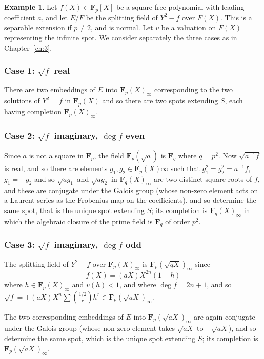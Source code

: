 \documentclass[10pt]{article}
\theoremstyle{definition}
\newtheorem{exam}[theo]{Example}
\def\FF{\mathbf{F}}
\begin{document}
\begin{exam}
\label{4.2.8}
Let $f(X) \in \FF_p[X]$ be a square-free polynomial with leading coefficient $a$, and let $E/F$ be the splitting field of $Y^2 - f$ over $F(X)$.
This is a separable extension if $p \not= 2$, and is normal.
Let $v$ be a valuation on $F(X)$ representing the infinite spot.
We consider separately the three cases as in Chapter~\ref{ch:3}.


\subsubsection[Case 1]{Case 1: $\sqrt f$ real}
\label{4.2.8.1}

There are two embeddings of $E$ into $\FF_p(X)_\infty$ corresponding to the two solutions of $Y^2 = f$ in $\FF_p(X)$ and so there are two spots extending $S$, each having completion $\FF_p(X)_\infty$.


\subsubsection[Case 2]{Case 2: $\sqrt f$ imaginary, $\deg f$ even}
\label{4.2.8.2}

Since $a$ is not a square in $\FF_p$, the field $\FF_p(\sqrt a)$ is $\FF_q$ where $q = p^2$.
Now $\sqrt{a^{-1}f}$ is real, and so there are elements $g_1,g_2 \in \FF_p(X)\infty$ such that $g_1^2 = g_2^2 = a^{-1}f$, $g_1 = -g_2$ and so $\sqrt{ag_1}$ and $\sqrt{ag_2}$ in $\FF_q(X)_\infty$ are two distinct square roots of $f$, and these are conjugate under the Galois group (whose non-zero element acts on a Laurent series as the Frobenius map on the coefficients), and so determine the same spot, that is the unique spot extending $S$; its completion is $\FF_q(X)_\infty$ in which the algebraic closure of the prime field is $\FF_q$ of order $p^2$.

\subsubsection[Case 3]{Case 3: $\sqrt f$ imaginary, $\deg f$ odd}
\label{4.2.8.3}

The splitting field of $Y^2 - f$ over $\FF_p(X)_\infty$ is $\FF_p(\sqrt{qX})_\infty$ since 
\[
f(X) = (aX) X^{2n} (1+h)
\]
where $h \in \FF_p(X)_\infty$ and $v(h) < 1$, and where $\deg f = 2n+1$, and so $\sqrt f = \pm (aX) X^n \sum \binom{1/2}{r} h^r \in \FF_p(\sqrt{aX})_\infty$.

The two corresponding embeddings of $E$ into $\FF_p(\sqrt{aX})_\infty$ are again conjugate under the Galois group (whose non-zero element takes $\sqrt{aX}$ to $-\sqrt{aX}$), and so determine the same spot, which is the unique spot extending $S$; its completion is $\FF_p(\sqrt{aX})_\infty$.


\end{exam}
\end{document}
